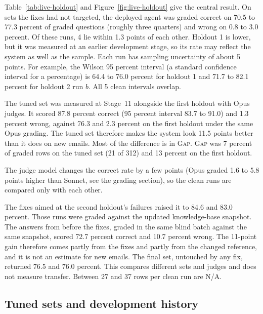 

Table~\ref{tab:live-holdout} and Figure~\ref{fig:live-holdout} give the central result. On sets the fixes had not targeted, the deployed agent was graded correct on 70.5 to 77.3 percent of graded questions (roughly three quarters) and wrong on 0.8 to 3.0 percent. Of these runs, 4 lie within 1.3 points of each other. Holdout 1 is lower, but it was measured at an earlier development stage, so its rate may reflect the system as well as the sample. Each run has sampling uncertainty of about 5 points. For example, the Wilson 95 percent interval (a standard confidence interval for a percentage) is 64.4 to 76.0 percent for holdout 1 and 71.7 to 82.1 percent for holdout 2 run $b$. All 5 clean intervals overlap.

The tuned set was measured at Stage~11 alongside the first holdout with Opus judges. It scored 87.8 percent correct (95 percent interval 83.7 to 91.0) and 1.3 percent wrong, against 76.3 and 2.3 percent on the first holdout under the same Opus grading. The tuned set therefore makes the system look 11.5 points better than it does on new emails. Most of the difference is in \textsc{Gap}. \textsc{Gap} was 7 percent of graded rows on the tuned set (21 of 312) and 13 percent on the first holdout.

The judge model changes the correct rate by a few points (Opus graded 1.6 to 5.8 points higher than Sonnet, see the grading section), so the clean runs are compared only with each other.

The fixes aimed at the second holdout's failures raised it to 84.6 and 83.0 percent. Those runs were graded against the updated knowledge-base snapshot. The answers from before the fixes, graded in the same blind batch against the same snapshot, scored 72.7 percent correct and 10.7 percent wrong. The 11-point gain therefore comes partly from the fixes and partly from the changed reference, and it is not an estimate for new emails. The final set, untouched by any fix, returned 76.5 and 76.0 percent. This compares different sets and judges and does not measure transfer. Between 27 and 37 rows per clean run are N/A.

\subsection{Tuned sets and development history}



